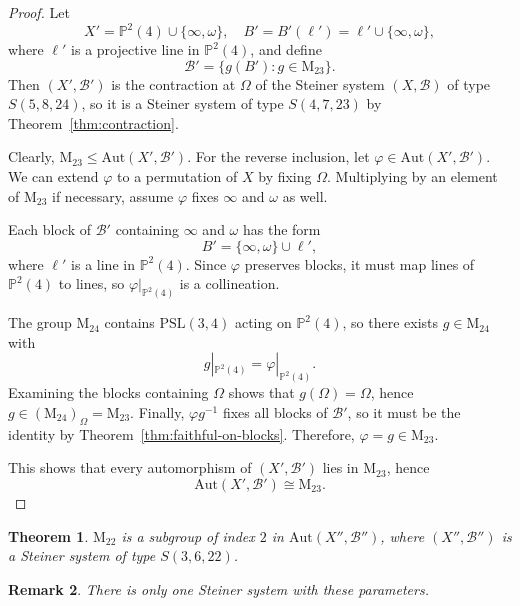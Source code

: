 \documentclass[12pt,a4paper,openany]{book}
\newtheorem{theorem}{Theorem}[section]
\newcommand{\PSL}{\mathrm{PSL}}
\newcommand{\Aut}{\mathrm{Aut}}
\renewcommand{\PSL}{\mathrm{PSL}}
\renewcommand{\PSL}{\mathrm{PSL}}
\newcommand{\PP}{\mathbb{P}}
\newtheorem{remark}[theorem]{Remark}
\begin{document}
\begin{proof}
Let 
\[
X' = \PP^2(4) \cup \{\infty, \omega\}, \quad 
B' = B'(\ell') = \ell' \cup \{\infty, \omega\},
\]
where $\ell'$ is a projective line in $\PP^2(4)$, and define
\[
\mathscr{B}' = \{ g(B') : g \in \mathrm{M}_{23} \}.
\]
Then $(X', \mathscr{B}')$ is the contraction at $\Omega$ of the Steiner system $(X, \mathscr{B})$ of type $S(5,8,24)$, so it is a Steiner system of type $S(4, 7, 23)$ by Theorem~\ref{thm:contraction}.

Clearly, $\mathrm{M}_{23} \le \Aut(X', \mathscr{B}')$. For the reverse inclusion, let $\varphi \in \Aut(X', \mathscr{B}')$. We can extend $\varphi$ to a permutation of $X$ by fixing $\Omega$. Multiplying by an element of $\mathrm{M}_{23}$ if necessary, assume $\varphi$ fixes $\infty$ and $\omega$ as well.

Each block of $\mathscr{B}'$ containing $\infty$ and $\omega$ has the form
\[
B' = \{\infty, \omega\} \cup \ell',
\]
where $\ell'$ is a line in $\PP^2(4)$. Since $\varphi$ preserves blocks, it must map lines of $\PP^2(4)$ to lines, so $\varphi|_{\PP^2(4)}$ is a collineation.

The group $\mathrm{M}_{24}$ contains $\PSL(3,4)$ acting on $\PP^2(4)$, so there exists $g \in \mathrm{M}_{24}$ with
\[
g|_{\PP^2(4)} = \varphi|_{\PP^2(4)}.
\]
Examining the blocks containing $\Omega$ shows that $g(\Omega) = \Omega$, hence $g \in (\mathrm{M}_{24})_\Omega = \mathrm{M}_{23}$. Finally, $\varphi g^{-1}$ fixes all blocks of $\mathscr{B}'$, so it must be the identity by Theorem~\ref{thm:faithful-on-blocks}. Therefore, $\varphi = g \in \mathrm{M}_{23}$.

This shows that every automorphism of $(X', \mathscr{B}')$ lies in $\mathrm{M}_{23}$, hence
\[
\Aut(X', \mathscr{B}') \cong \mathrm{M}_{23}.
\]
\end{proof}

\begin{theorem}\label{thm:M22-index2}
$\mathrm{M}_{22}$ is a subgroup of index $2$ in $\Aut(X'', \mathscr{B}'')$, where $(X'', \mathscr{B}'')$ is a Steiner system of type $S(3, 6, 22)$.
\end{theorem}

\begin{remark}
There is only one Steiner system with these parameters.
\end{remark}
\end{document}
